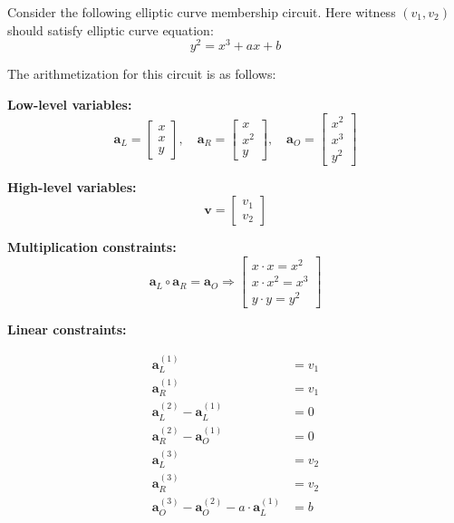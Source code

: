 \documentclass[../../book.tex]{subfiles}
\begin{document}
\begin{example}
    Consider the following elliptic curve membership circuit. Here witness $(v_1, v_2)$ should satisfy elliptic curve equation:
    \begin{equation*}
        y^2 = x^3 + ax + b
    \end{equation*}
    
    The arithmetization for this circuit is as follows:
    
    \textbf{Low-level variables:}
    \begin{equation*}
        \mathbf{a}_L = \begin{bmatrix} x \\ x \\ y \end{bmatrix}, \quad 
        \mathbf{a}_R = \begin{bmatrix} x \\ x^2 \\ y \end{bmatrix}, \quad 
        \mathbf{a}_O = \begin{bmatrix} x^2\\x^3 \\ y^2 \end{bmatrix}
    \end{equation*}
    
    \textbf{High-level variables:}
    \begin{equation*}
        \mathbf{v} = \begin{bmatrix} v_1 \\ v_2 \end{bmatrix}
    \end{equation*}
    
    \textbf{Multiplication constraints:}
    \begin{equation*}
        \mathbf{a}_L \circ \mathbf{a}_R = \mathbf{a}_O \Rightarrow \begin{bmatrix} 
            x \cdot x = x^2 \\
            x \cdot x^2 = x^3 \\ 
            y \cdot y = y^2
        \end{bmatrix}
    \end{equation*}
    
    \textbf{Linear constraints:}

    \begin{equation*}
        \begin{aligned}
            \mathbf{a}_L^{(1)} &= v_1 \\
            \mathbf{a}_R^{(1)} &= v_1 \\
            \mathbf{a}_L^{(2)} - \mathbf{a}_L^{(1)} &= 0 \\
            \mathbf{a}_R^{(2)} - \mathbf{a}_O^{(1)} &= 0 \\
            \mathbf{a}_L^{(3)} &= v_2 \\
            \mathbf{a}_R^{(3)} &= v_2 \\
            \mathbf{a}_O^{(3)} - \mathbf{a}_O^{(2)} - a \cdot \mathbf{a}_L^{(1)} &= b
        \end{aligned}
    \end{equation*}
    

\end{example}
\end{document}
